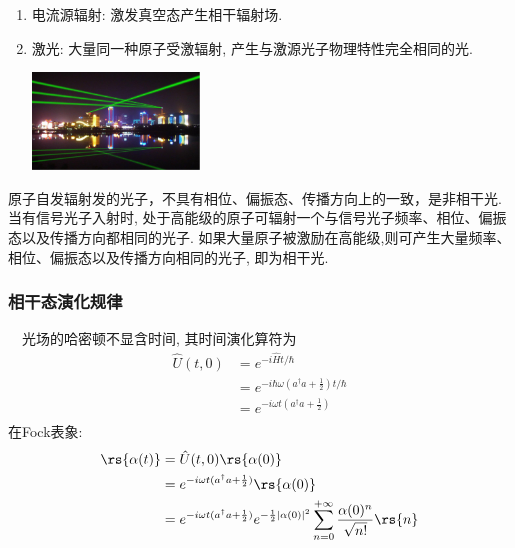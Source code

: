 \begin{frame}
 \begin{enumerate}
    \item 电流源辐射: 激发真空态产生相干辐射场.
    \item 激光: 大量同一种原子受激辐射, 产生与激源光子物理特性完全相同的光.  
     \begin{center}
      \includegraphics[width=0.35\textwidth]{figs/8.png}
    \end{center}   
 \end{enumerate}
 原子自发辐射发的光子，不具有相位、偏振态、传播方向上的一致，是非相干光. 当有信号光子入射时, 处于高能级的原子可辐射一个与信号光子频率、相位、偏振态以及传播方向都相同的光子. 如果大量原子被激励在高能级,则可产生大量频率、相位、偏振态以及传播方向相同的光子, 即为相干光.  
\end{frame}



\begin{frame}
    \frametitle{相干态演化规律}
        \例[10.已知$t=0$时刻的相干态为$\rs{\alpha (0)}$, 试求t时刻的相干态$\rs{\alpha (t)}$  ]{}
        \解 ~ 光场的哈密顿不显含时间, 其时间演化算符为
    \[ \begin{aligned}
     \hat{U}(t, 0)  &= e^{-i \hat{H}t / \hbar}\\ 
     &= e^{-i \hbar \omega ( a^\dagger a+\frac{1}{2} ) t / \hbar} \\ 
     &= e^{-i \omega t (a^\dagger a +\frac{1}{2} )}  \\ 
    \end{aligned}\]
    在Fock表象:
    \[ \begin{aligned}
        \rs{\alpha (t)} &= \hat{U}(t, 0) \rs{\alpha (0)} \\ 
        &= e^{-i \omega t ( a^\dagger a +\frac{1}{2} )} \rs{\alpha (0)} \\ 
        &= e^{-i \omega t ( a^\dagger a +\frac{1}{2} )} e^{-\frac{1}{2}\left|\alpha(0)\right|^2}  \sum_{n=0} ^{+\infty}  \frac{\alpha(0)^n}{\sqrt{n!}} \rs{n}  \\  
       \end{aligned}\]
\end{frame}

